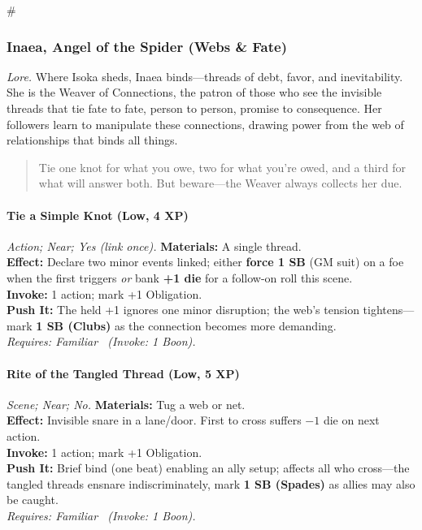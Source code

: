 # %

\subsubsection{Inaea, Angel of the Spider (Webs \& Fate)}
\textit{Lore.} Where Isoka sheds, Inaea binds—threads of debt, favor, and inevitability. She is the Weaver of Connections, the patron of those who see the invisible threads that tie fate to fate, person to person, promise to consequence. Her followers learn to manipulate these connections, drawing power from the web of relationships that binds all things.

\begin{quote}
Tie one knot for what you owe, two for what you're owed, and a third for what will answer both. But beware—the Weaver always collects her due.
\end{quote}

\paragraph*{Tie a Simple Knot (Low, 4 XP)} \emph{Action; Near; Yes (link once).}
\textbf{Materials:} A single thread.\\
\textbf{Effect:} Declare two minor events linked; either \textbf{force 1 SB} (GM suit) on a foe when the first triggers \emph{or} bank \textbf{+1 die} for a follow-on roll this scene.\\
\textbf{Invoke:} 1 action; mark +1 Obligation.\\
\textbf{Push It:} The held +1 ignores one minor disruption; the web's tension tightens—mark \textbf{1 SB (Clubs)} as the connection becomes more demanding.\\
\emph{Requires: Familiar \ (\textit{Invoke:} 1 Boon).}

\paragraph*{Rite of the Tangled Thread (Low, 5 XP)} \emph{Scene; Near; No.}
\textbf{Materials:} Tug a web or net.\\
\textbf{Effect:} Invisible snare in a lane/door. First to cross suffers \(-1\) die on next action.\\
\textbf{Invoke:} 1 action; mark +1 Obligation.\\
\textbf{Push It:} Brief bind (one beat) enabling an ally setup; affects all who cross—the tangled threads ensnare indiscriminately, mark \textbf{1 SB (Spades)} as allies may also be caught.\\
\emph{Requires: Familiar \ (\textit{Invoke:} 1 Boon).}

